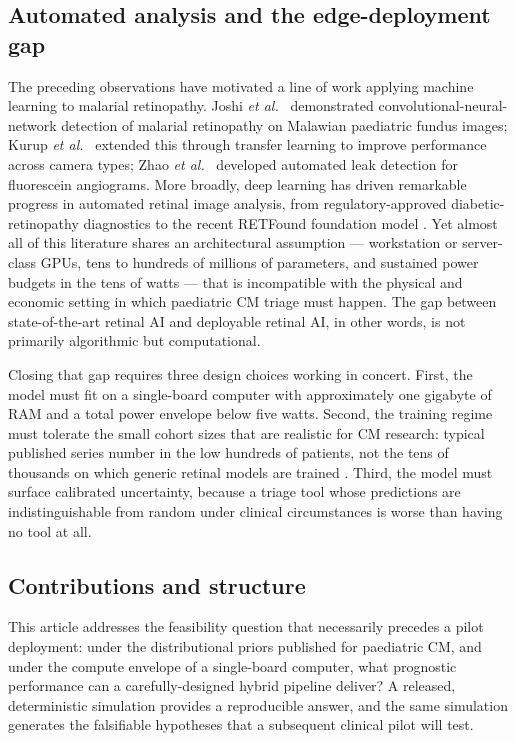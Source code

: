 \documentclass[twocolumn,10pt]{article}
\begin{document}
\subsection{Automated analysis and the edge-deployment gap}
The preceding observations have motivated a line of work applying
machine learning to malarial retinopathy. Joshi \emph{et al.}\
\cite{Joshi2017} demonstrated convolutional-neural-network
detection of malarial retinopathy on Malawian paediatric fundus
images; Kurup \emph{et al.}\ \cite{Kurup2023} extended this
through transfer learning to improve performance across camera
types; Zhao \emph{et al.}\ \cite{Zhao2015} developed automated
leak detection for fluorescein angiograms. More broadly, deep
learning has driven remarkable progress in automated retinal image
analysis, from regulatory-approved diabetic-retinopathy diagnostics
\cite{Abramoff2018IDx,Gulshan2016} to the recent RETFound
foundation model \cite{Zhou2023RETFound}. Yet almost all of this
literature shares an architectural assumption --- workstation or
server-class GPUs, tens to hundreds of millions of parameters, and
sustained power budgets in the tens of watts --- that is
incompatible with the physical and economic setting in which
paediatric CM triage must happen. The gap between state-of-the-art
retinal AI and deployable retinal AI, in other words, is not
primarily algorithmic but computational.

Closing that gap requires three design choices working in concert.
First, the model must fit on a single-board computer with
approximately one gigabyte of RAM and a total power envelope below
five watts. Second, the training regime must tolerate the small
cohort sizes that are realistic for CM research: typical published
series number in the low hundreds of patients, not the tens of
thousands on which generic retinal models are trained
\cite{Beare2006,Beare2009,Joshi2017}. Third, the model must
surface calibrated uncertainty, because a triage tool whose
predictions are indistinguishable from random under clinical
circumstances is worse than having no tool at all.

\subsection{Contributions and structure}
This article addresses the feasibility question that necessarily
precedes a pilot deployment: under the distributional priors
published for paediatric CM, and under the compute envelope of a
single-board computer, what prognostic performance can a
carefully-designed hybrid pipeline deliver? A released,
deterministic simulation provides a reproducible answer, and the
same simulation generates the falsifiable hypotheses that a
subsequent clinical pilot will test.
\end{document}
